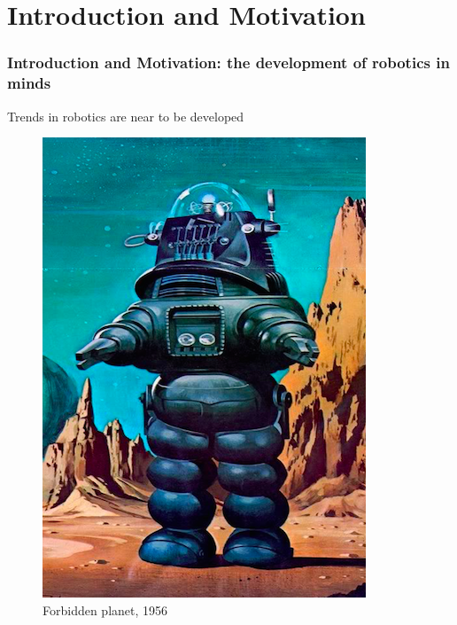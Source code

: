 \documentclass{beamer}
\begin{document}
	\section*{Introduction and Motivation}
	\begin{frame}
		\frametitle{Introduction and Motivation: the development of robotics in minds}
		\centering
		Trends in robotics are near to be developed
		
		\begin{figure}[h!]
			\begin{minipage}[H]{0.20\linewidth}
				\includegraphics[width=\linewidth]{presentation_images/1}
				\caption{Forbidden planet, 1956}
			\end{minipage}
			\hfill
			\begin{minipage}[H]{0.20\linewidth}

\end{minipage}
\end{figure}
\end{frame}
\end{document}
